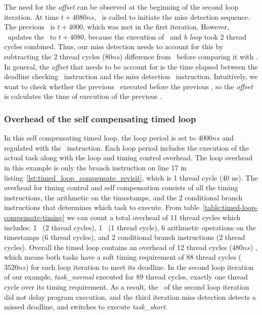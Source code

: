 The need for the \emph{offset} can be observed at the beginning of the second loop iteration.
At time $t+4080ns$, \gettime\ is called to initiate the miss detection sequence.
The previous \deadlinet\ is $t+4000$, which was met in the first iteration.  
However, \gettime\ updates the \currentt\ to $t+4080$, because the execution of \delayuntil\ and \emph{b loop} took 2 thread cycles combined. 
Thus, our miss detection needs to account for this by subtracting the 2 thread cycles ($80ns$) difference from \currentt\ before comparing it with \deadlinet.
In general, the \emph{offset} that needs to be account for is the time elapsed between the deadline checking \delayuntil\ instruction and the miss detection \gettime\ instruction.
Intuitively, we want to check whether the previous \delayuntil\ executed before the previous \deadlinet, so the \emph{offset} is calculates the time of execution of the previous \delayuntil.  

\subsubsection{Overhead of the self compensating timed loop}
In this self compensating timed loop, the loop period is set to $4000ns$ and regulated with the \delayuntil\ instruction.
Each loop period includes the execution of the actual task along with the loop and timing control overhead.
The loop overhead in this example is only the branch instruction on line 17 in listing~\ref{lst:timed_loop_compensate_revisit}, which is 1 thread cycle (40 ns).
The overhead for timing control and self compensation consists of all the timing instructions, the arithmetic on the timestamps, and the 2 conditional branch instructions that determines which task to execute.
From table~\ref{table:timed-loop-compensate-timing} we can count a total overhead of 11 thread cycles which includes: 1 \gettime\ (2 thread cycles), 1 \delayuntil\ (1 thread cycle), 6 arithmetic operations on the timestamps (6 thread cycles), and 2 conditional branch instructions (2 thread cycles).
Overall the timed loop contains an overhead of 12 thread cycles ($480ns$) , which means both tasks have a soft timing requirement of 88 thread cycles ($3520ns$) for each loop iteration to meet its deadline.  
In the second loop iteration of our example, \emph{task\_normal} executed for 89 thread cycles, exactly one thread cycle over its timing requirement. 
As a result, the \delayuntil\ of the second loop iteration did not delay program execution, and the third iteration miss detection detects a missed deadline, and switches to execute \emph{task\_short}. 

